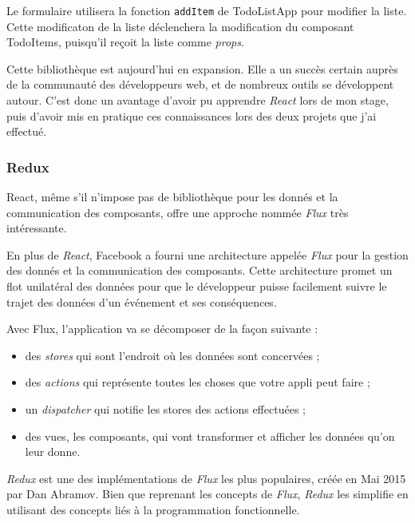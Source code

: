 Le formulaire utilisera la fonction \texttt{addItem} de TodoListApp pour
modifier la liste. Cette modificaton de la liste déclenchera la
modification du composant TodoItems, puisqu'il reçoit la liste comme
\emph{props}.

\bigskip

Cette bibliothèque est aujourd'hui en expansion. Elle a un succès
certain auprès de la communauté des développeurs web, et de nombreux
outils se développent autour. C'est donc un avantage d'avoir pu
apprendre \emph{React} lors de mon stage, puis d'avoir mis en pratique
ces connaissances lors des deux projets que j'ai effectué.

\bigskip

\subsubsection{Redux}\label{redux}

\bigskip

React, même s'il n'impose pas de bibliothèque pour les donnés et la
communication des composants, offre une approche nommée \emph{Flux} très
intéressante.

\bigskip

En plus de \emph{React}, Facebook a fourni une architecture appelée
\emph{Flux} pour la gestion des donnés et la communication des
composants. Cette architecture promet un flot unilatéral des données
pour que le développeur puisse facilement suivre le trajet des données
d'un événement et ses conséquences.

\bigskip

Avec Flux, l'application va se décomposer de la façon suivante :

\begin{itemize}
\tightlist
\item
  des \emph{stores} qui sont l'endroit où les données sont concervées ;
\item
  des \emph{actions} qui représente toutes les choses que votre appli
  peut faire ;
\item
  un \emph{dispatcher} qui notifie les stores des actions effectuées ;
\item
  des vues, les composants, qui vont transformer et afficher les données
  qu'on leur donne.
\end{itemize}

\bigskip

\emph{Redux} est une des implémentations de \emph{Flux} les plus
populaires, créée en Mai 2015 par Dan Abramov. Bien que reprenant les
concepts de \emph{Flux}, \emph{Redux} les simplifie en utilisant des
concepts liés à la programmation fonctionnelle.

